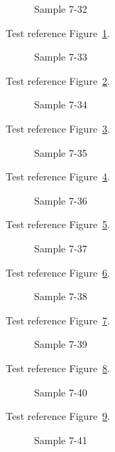 \begin{figure}[tbhp]
\caption{Sample 7-32}
\label{fig:sample-7-32}
\end{figure}

Test reference Figure~\ref{fig:sample-7-32}.

\begin{figure}[tbhp]
\caption{Sample 7-33}
\label{fig:sample-7-33}
\end{figure}

Test reference Figure~\ref{fig:sample-7-33}.

\begin{figure}[tbhp]
\caption{Sample 7-34}
\label{fig:sample-7-34}
\end{figure}

Test reference Figure~\ref{fig:sample-7-34}.

\begin{figure}[tbhp]
\caption{Sample 7-35}
\label{fig:sample-7-35}
\end{figure}

Test reference Figure~\ref{fig:sample-7-35}.

\begin{figure}[tbhp]
\caption{Sample 7-36}
\label{fig:sample-7-36}
\end{figure}

Test reference Figure~\ref{fig:sample-7-36}.

\begin{figure}[tbhp]
\caption{Sample 7-37}
\label{fig:sample-7-37}
\end{figure}

Test reference Figure~\ref{fig:sample-7-37}.

\begin{figure}[tbhp]
\caption{Sample 7-38}
\label{fig:sample-7-38}
\end{figure}

Test reference Figure~\ref{fig:sample-7-38}.

\begin{figure}[tbhp]
\caption{Sample 7-39}
\label{fig:sample-7-39}
\end{figure}

Test reference Figure~\ref{fig:sample-7-39}.

\begin{figure}[tbhp]
\caption{Sample 7-40}
\label{fig:sample-7-40}
\end{figure}

Test reference Figure~\ref{fig:sample-7-40}.

\begin{figure}[tbhp]
\caption{Sample 7-41}
\label{fig:sample-7-41}
\end{figure}

